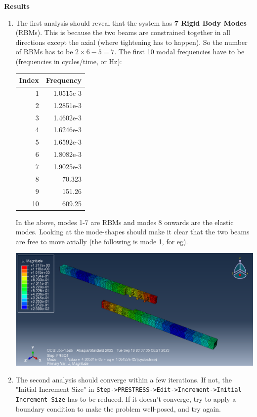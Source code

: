 \documentclass[11pt]{article}
\begin{document}
\textbf{Results}
\begin{enumerate}
\item The first analysis should reveal that the system has \textbf{7 Rigid Body Modes} (RBMs).
This is because the two beams are  constrained together in all directions except the axial (where tightening has to happen).
So the number of RBMs has to be \(2\times 6 - 5 = 7\).
The first 10 modal frequencies have to be (frequencies in cycles/time, or Hz):
\begin{center}
\begin{tabular}{rr}
Index & Frequency\\[0pt]
\hline
1 & 1.0515e-3\\[0pt]
2 & 1.2851e-3\\[0pt]
3 & 1.4602e-3\\[0pt]
4 & 1.6246e-3\\[0pt]
5 & 1.6592e-3\\[0pt]
6 & 1.8082e-3\\[0pt]
7 & 1.9025e-3\\[0pt]
8 & 70.323\\[0pt]
9 & 151.26\\[0pt]
10 & 609.25\\[0pt]
\end{tabular}
\end{center}
In the above, modes 1-7 are RBMs and modes 8 onwards are the elastic modes.
Looking at the mode-shapes should make it clear that the two beams are free to move axially (the following is mode 1, for eg).
\begin{center}
\includegraphics[width=.9\linewidth]{./figs/res1.png}
\end{center}
\item The second analysis should converge within a few iterations.
If not, the "Initial Increment Size" in \texttt{Step->PRESTRESS->Edit->Increment->Initial Increment Size} has to be reduced.
If it doesn't converge, try to apply a boundary condition to make the problem well-posed, and try again.

\end{enumerate}
\end{document}
